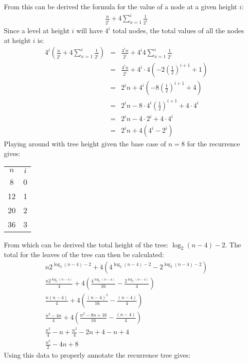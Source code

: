 From this can be derived the formula for the value of a node at a given height $i$:
\begin{eqnarray*}
	\frac{n}{2^i} + 4 \sum^i_{x=1} \frac{1}{2^i}
\end{eqnarray*}
Since a level at height $i$ will have $4^i$ total nodes, the total values of all the nodes at height $i$ is:
\begin{eqnarray*}
	4^i \left ( \frac{n}{2^i} + 4 \sum^i_{x=1} \frac{1}{2^i} \right ) & = & \frac{4^i n}{2^i} + 4^i 4 \sum^i_{x=1} \frac{1}{2^i} \\
	& = & \frac{4^i n}{2^i} + 4^i \cdot 4 \left ( -2 \left ( \frac{1}{2} \right )^{i+1} + 1 \right ) \\
	& = & 2^i n + 4^i \left ( -8 \left ( \frac{1}{2} \right )^{i+1} + 4 \right ) \\
	& = & 2^i n - 8 \cdot 4^i \left ( \frac{1}{2} \right )^{i+1} + 4 \cdot 4^i \\
	& = & 2^i n - 4 \cdot 2^i + 4 \cdot 4^i  \\
	& = & 2^i n + 4 \left (4^i - 2^i \right )
\end{eqnarray*}
Playing around with tree height given the base case of $n=8$ for the recurrence gives:
\begin{center}
\begin{tabular}{c|c}
	$n$ & $i$ \\
	8 & 0 \\
	12 & 1 \\
	20 & 2 \\
	36 & 3
\end{tabular}
\end{center}
From which can be derived the total height of the tree: $\log_2(n-4) - 2$.  The total for the leaves of the tree can then be calculated:
\begin{eqnarray*}
	n2^{\log_2(n-4)-2} + 4 \left ( 4^{\log_2(n-4)-2} - 2^{\log_2(n-4)-2} \right ) \\
	\frac{n 2^{\log_2(n-4)}}{4} + 4 \left ( \frac{4^{\log_2(n-4)}}{16} - \frac{2^{\log_2(n-4)}}{4} \right ) \\
	\frac{n(n-4)}{4} + 4 \left ( \frac{(n-4)^2}{16} - \frac{(n-4)}{4} \right ) \\
	\frac{n^2 -4n}{4} + 4 \left ( \frac{n^2 - 8n + 16}{16} - \frac{(n-4)}{4} \right ) \\
	\frac{n^2}{4} - n + \frac{n^2}{4} - 2n + 4 - n + 4 \\
	\frac{n^2}{2} - 4n + 8
\end{eqnarray*}
Using this data to properly annotate the recurrence tree gives:
